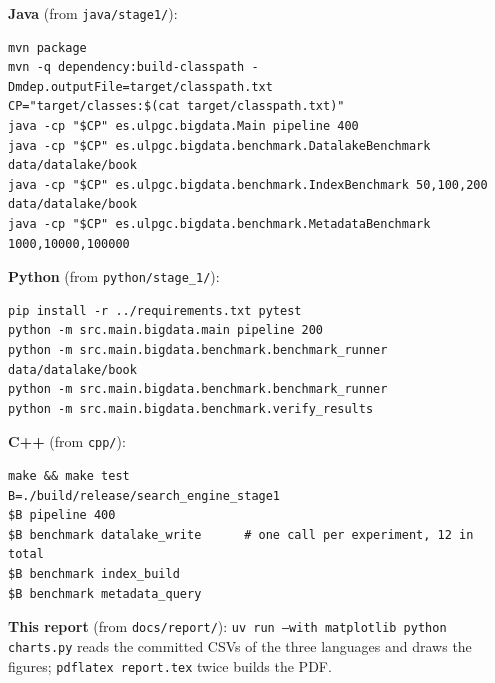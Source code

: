 \documentclass[11pt,a4paper]{article}
\newcommand{\code}[1]{\texttt{#1}}
\begin{document}
\textbf{Java} (from \code{java/stage1/}):
\begin{lstlisting}
mvn package
mvn -q dependency:build-classpath -Dmdep.outputFile=target/classpath.txt
CP="target/classes:$(cat target/classpath.txt)"
java -cp "$CP" es.ulpgc.bigdata.Main pipeline 400
java -cp "$CP" es.ulpgc.bigdata.benchmark.DatalakeBenchmark data/datalake/book
java -cp "$CP" es.ulpgc.bigdata.benchmark.IndexBenchmark 50,100,200 data/datalake/book
java -cp "$CP" es.ulpgc.bigdata.benchmark.MetadataBenchmark 1000,10000,100000
\end{lstlisting}

\textbf{Python} (from \code{python/stage\_1/}):
\begin{lstlisting}
pip install -r ../requirements.txt pytest
python -m src.main.bigdata.main pipeline 200
python -m src.main.bigdata.benchmark.benchmark_runner data/datalake/book
python -m src.main.bigdata.benchmark.benchmark_runner
python -m src.main.bigdata.benchmark.verify_results
\end{lstlisting}

\textbf{C++} (from \code{cpp/}):
\begin{lstlisting}
make && make test
B=./build/release/search_engine_stage1
$B pipeline 400
$B benchmark datalake_write      # one call per experiment, 12 in total
$B benchmark index_build
$B benchmark metadata_query
\end{lstlisting}

\textbf{This report} (from \code{docs/report/}): \code{uv run --with matplotlib python charts.py}
reads the committed CSVs of the three languages and draws the figures; \code{pdflatex report.tex}
twice builds the PDF.
\end{document}

